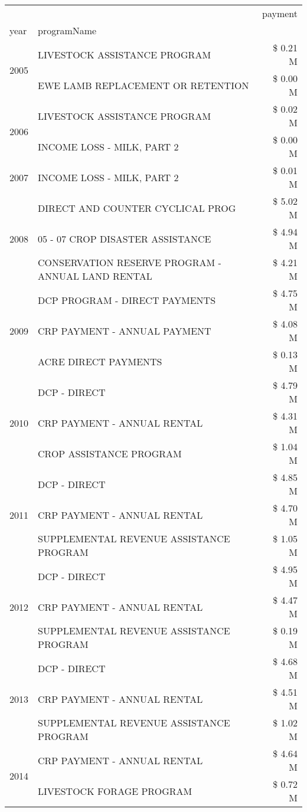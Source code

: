 \begin{tabular}{llr}
\toprule
 &  & payment \\
year & programName &  \\
\midrule
\multirow[t]{2}{*}{2005} & LIVESTOCK ASSISTANCE PROGRAM & \$ 0.21 M \\
 & EWE LAMB REPLACEMENT OR RETENTION & \$ 0.00 M \\
\cline{1-3}
\multirow[t]{2}{*}{2006} & LIVESTOCK ASSISTANCE PROGRAM & \$ 0.02 M \\
 & INCOME LOSS - MILK, PART 2 & \$ 0.00 M \\
\cline{1-3}
2007 & INCOME LOSS - MILK, PART 2 & \$ 0.01 M \\
\cline{1-3}
\multirow[t]{3}{*}{2008} & DIRECT AND COUNTER CYCLICAL PROG & \$ 5.02 M \\
 & 05 - 07 CROP DISASTER ASSISTANCE & \$ 4.94 M \\
 & CONSERVATION RESERVE PROGRAM - ANNUAL LAND RENTAL & \$ 4.21 M \\
\cline{1-3}
\multirow[t]{3}{*}{2009} & DCP PROGRAM - DIRECT PAYMENTS & \$ 4.75 M \\
 & CRP PAYMENT - ANNUAL PAYMENT & \$ 4.08 M \\
 & ACRE DIRECT PAYMENTS & \$ 0.13 M \\
\cline{1-3}
\multirow[t]{3}{*}{2010} & DCP - DIRECT & \$ 4.79 M \\
 & CRP PAYMENT - ANNUAL RENTAL & \$ 4.31 M \\
 & CROP ASSISTANCE PROGRAM & \$ 1.04 M \\
\cline{1-3}
\multirow[t]{3}{*}{2011} & DCP - DIRECT & \$ 4.85 M \\
 & CRP PAYMENT - ANNUAL RENTAL & \$ 4.70 M \\
 & SUPPLEMENTAL REVENUE ASSISTANCE PROGRAM & \$ 1.05 M \\
\cline{1-3}
\multirow[t]{3}{*}{2012} & DCP - DIRECT & \$ 4.95 M \\
 & CRP PAYMENT - ANNUAL RENTAL & \$ 4.47 M \\
 & SUPPLEMENTAL REVENUE ASSISTANCE PROGRAM & \$ 0.19 M \\
\cline{1-3}
\multirow[t]{3}{*}{2013} & DCP - DIRECT & \$ 4.68 M \\
 & CRP PAYMENT - ANNUAL RENTAL & \$ 4.51 M \\
 & SUPPLEMENTAL REVENUE ASSISTANCE PROGRAM & \$ 1.02 M \\
\cline{1-3}
\multirow[t]{3}{*}{2014} & CRP PAYMENT - ANNUAL RENTAL & \$ 4.64 M \\
 & LIVESTOCK FORAGE PROGRAM & \$ 0.72 M \\

\end{tabular}
